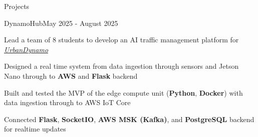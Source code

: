 \documentclass[
	11pt, %
]{resume} %
\begin{document}
\begin{rSection}{Projects}



	\begin{rSubsection}{DynamoHub}{May 2025 - August 2025}{}{}
		\item Lead a team of 8 students to develop an AI traffic management platform for \textit{\href{https://urbandynamo.com}{UrbanDynamo}}
		\item Designed a real time system from data ingestion through sensors and Jetson Nano through to \textbf{AWS} and \textbf{Flask} backend
		\item Built and tested the MVP of the edge compute unit (\textbf{Python}, \textbf{Docker}) with data ingestion through to AWS IoT Core
		\item Connected \textbf{Flask}, \textbf{SocketIO}, \textbf{AWS MSK (Kafka)}, and \textbf{PostgreSQL} backend for realtime updates
	\end{rSubsection}
\end{rSection}

%
%
\end{document}
